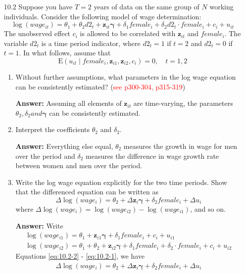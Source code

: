 \begin{enumerate}
    \item[10.2] Suppose you have $T=2$ years of data on the same group of $N$ working individuals. Consider the following model of wage determination:
    \[ \log \left(wage_{it}\right)=\theta_{1}+\theta_{2} d 2_{t}+\mathbf{z}_{i t} \bm{\gamma}+\delta_{1} female_{i}+\delta_{2} d 2_{t} \cdot female_{i}+c_{i}+u_{i t} \]
    The unobserved effect $c_{i}$ is allowed to be correlated with $\mathbf{z}_{i t}$ and $female_{i}$. The variable $d 2_{t}$ is a time period indicator, where $d 2_{t}=1$ if $t=2$ and $d 2_{t}=0$ if $t=1$. In what follows, assume that
    \[ \mathrm{E}\left(u_{i t} \mid female_{i}, \mathbf{z}_{i 1}, \mathbf{z}_{i 2}, c_{i}\right)=0, \quad t=1,2 \]
    
    \begin{enumerate}
        \item Without further assumptions, what parameters in the log wage equation can be consistently estimated? (\textcolor{red}{see p300-304, p315-319})
        
        \textbf{Answer:} Assuming all elements of $\mathbf{z}_{it}$ are time-varying, the parameters $\theta_2, \delta_2 and \mathbf{\gamma}$ can be consistently estimated.
        
        \item Interpret the coefficients $\theta_{2}$ and $\delta_{2}$.
        
        \textbf{Answer:} Everything else equal, $\theta_2$ measures the growth in wage for men over the period and $\delta_2$ measures the difference in wage growth rate between women and men over the period.
        
        \item Write the log wage equation explicitly for the two time periods. Show that the differenced equation can be written as
        \[ \Delta \log \left(wage_{i}\right)=\theta_{2}+\Delta \mathbf{z}_{i} \bm{\gamma}+\delta_{2} female_{i}+\Delta u_{i} \]
        where $\Delta \log \left( wage_{i}\right)=\log \left(wage_{i 2}\right)-\log \left(wage_{i 1}\right)$, and so on.
        
        \textbf{Answer:} Write
        \begin{gather}
            \log \left(wage_{i1}\right)=\theta_{1}+\mathbf{z}_{i1} \bm{\gamma}+\delta_{1} female_{i}+c_{i}+u_{i1} \label{eq:10.2-1} \\
            \log \left(wage_{i2}\right)=\theta_{1}+\theta_{2}+\mathbf{z}_{i 2} \bm{\gamma}+\delta_{1} female_{i}+\delta_{2} \cdot female_{i}+c_{i}+u_{i2} \label{eq:10.2-2}
        \end{gather}
        Equations \eqref{eq:10.2-2} - \eqref{eq:10.2-1}, we have
        \begin{gather}
            \Delta \log \left(wage_{i}\right)=\theta_{2}+\Delta \mathbf{z}_{i} \bm{\gamma}+\delta_{2} female_{i}+\Delta u_{i} \label{eq:10.2-3}
        \end{gather}
        

\end{enumerate}
\end{enumerate}
